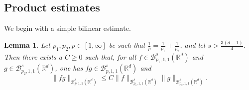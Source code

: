 \documentclass{amsart}
\newtheorem{lemma}[theorem]{Lemma}
\theoremstyle{definition}
\newcommand{\R}{\mathbb{R}}
\newcommand {\Rd}{\mathbb{R}^{d}}
\newcommand {\Ba}{\mathcal{B}}
\numberwithin{equation}{section}
\begin{document}
\subsection{Product estimates}\label{subsec:product}

We begin with a simple  bilinear estimate.

\begin{lemma}\label{lem:ProductEstimateI}
Let $p_{1},p_{2},p\in[1,\infty]$ be such that $\frac{1}{p}=\frac{1}{p_{1}}+\frac{1}{p_{2}}$, and let $s> \frac{3(d-1)}{4}$. Then there exists a $C\geq0$ such that, for all $f\in \Ba^{s}_{p_{1},1,1}(\Rd)$ and $g \in \mathcal{B}^s_{p_{2},1,1}(\R^d)$, one has $fg\in \Ba^{s}_{p,1,1}(\Rd)$ and
\[
\| f g \|_{\mathcal{B}^s_{p,1,1}(\R^d)} \leq C \| f \|_{\mathcal{B}^s_{p_1,1,1}(\R^d)} \| g \|_{\mathcal{B}^{s}_{p_2,1,1}(\R^d)}.
\]
\end{lemma}
\end{document}

